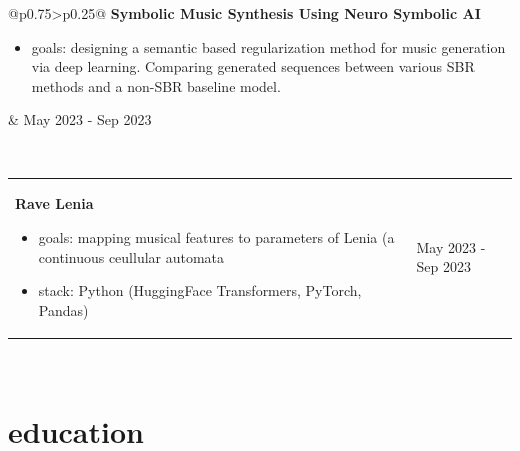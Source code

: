\documentclass[a4paper]{article}
\makeatletter
\newlength{\tablewidth}
\newenvironment{period}[2]{%
\newcommand{\sarma}{#2}%
\setlength{\tablewidth}{\linewidth}
\addtolength{\tablewidth}{-2\tabcolsep}
\begin{tabular}{@{}p{0.75\tablewidth}>{\raggedleft\arraybackslash}p{0.25\tablewidth}@{}}%
#1 \newline
\begin{itemize}
}{%
\end{itemize} & \sarma \\%
\end{tabular}\\
}
\makeatother
\begin{document}
    \begin{period}{\textbf{Symbolic Music Synthesis Using Neuro Symbolic
AI}}{May 2023 - Sep 2023}
        \item goals: designing a semantic based regularization method for music generation via deep learning. Comparing generated sequences between various SBR methods and a non-SBR baseline model.
    \end{period}

    \begin{period}{\textbf{Rave Lenia}}{Apr 2022 - Jun 2022}
        \item goals: mapping musical features to parameters of Lenia (a continuous ceullular automata
        \item stack: Python (HuggingFace Transformers, PyTorch, Pandas)
    \end{period}
    
\section{education}
\end{document}

